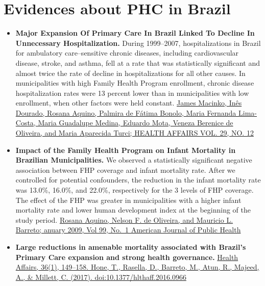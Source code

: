 \documentclass[]{book}
\begin{document}
\hypertarget{evidences-about-phc-in-brazil}{%
\section*{Evidences about PHC in Brazil}\label{evidences-about-phc-in-brazil}}

\begin{itemize}
\item
  \textbf{Major Expansion Of Primary Care In Brazil Linked To Decline In Unnecessary Hospitalization.} During 1999--2007, hospitalizations in Brazil for ambulatory care--sensitive chronic diseases, including cardiovascular disease, stroke, and asthma, fell at a rate that was statistically significant and almost twice the rate of decline in hospitalizations for all other causes. In municipalities with high Family Health Program enrollment, chronic disease hospitalization rates were 13 percent lower than in municipalities with low enrollment, when other factors were held constant. \href{https://www.healthaffairs.org/doi/full/10.1377/hlthaff.2010.0251}{James Macinko, Inês Dourado, Rosana Aquino, Palmira de Fátima Bonolo, Maria Fernanda Lima-Costa, Maria Guadalupe Medina, Eduardo Mota, Veneza Berenice de Oliveira, and Maria Aparecida Turci; HEALTH AFFAIRS VOL. 29, NO. 12}
\item
  \textbf{Impact of the Family Health Program on Infant Mortality in Brazilian Municipalities.} We observed a statistically significant negative association between FHP coverage and infant mortality rate. After we controlled for potential confounders, the reduction in the infant mortality rate was 13.0\%, 16.0\%, and 22.0\%, respectively for the 3 levels of FHP coverage. The effect of the FHP was greater in municipalities with a higher infant mortality rate and lower human development index at the beginning of the study period. \href{https://www.ncbi.nlm.nih.gov/pmc/articles/PMC2636620/pdf/87.pdf}{Rosana Aquino, Nelson F. de Oliveira, and Mauricio L. Barreto; anuary 2009, Vol 99, No.~1 \textbar{} American Journal of Public Health}
\item
  \textbf{Large reductions in amenable mortality associated with Brazil's Primary Care expansion and strong health governance.} \href{https://www.healthaffairs.org/doi/full/10.1377/hlthaff.2016.0966?url_ver=Z39.88-2003\&rfr_id=ori:rid:crossref.org\&rfr_dat=cr_pub\%3dpubmed}{Health Affairs, 36(1), 149--158. Hone, T., Rasella, D., Barreto, M., Atun, R., Majeed, A., \& Millett, C. (2017). doi:10.1377/hlthaff.2016.0966}

\end{itemize}
\end{document}
